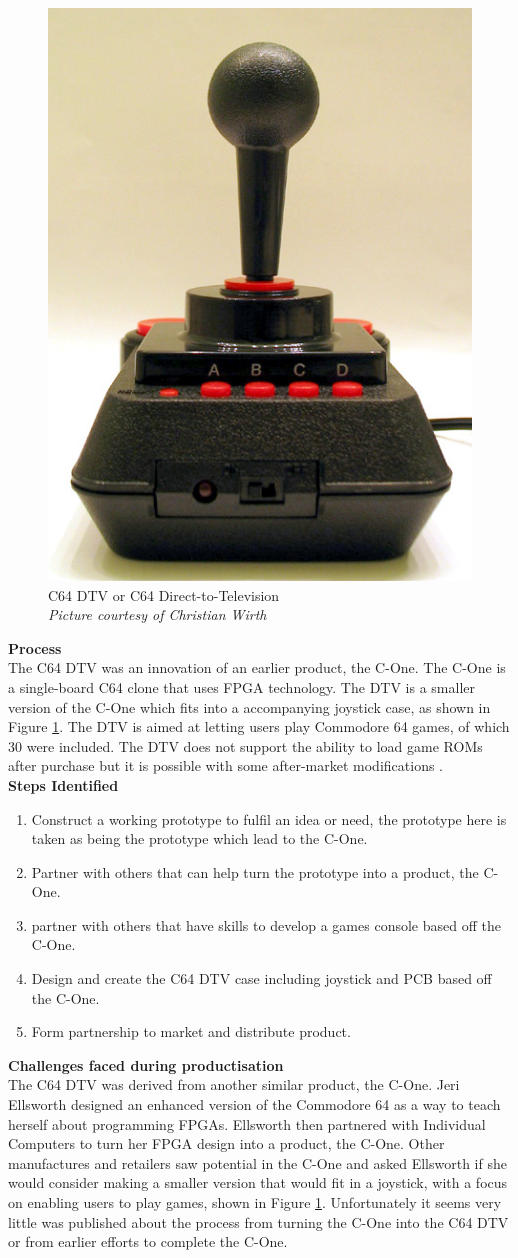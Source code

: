 \begin{figure} \begin{center}
\includegraphics[width=.3\linewidth]{pics/C64_DTV} 
\end{center} 
\caption{C64 DTV or C64 Direct-to-Television \\ \textit{\small{Picture courtesy of Christian Wirth}}}
\label{C64_DTV}
\end{figure}

\textbf{Process}\\
The C64 DTV was an innovation of an earlier product, the C-One. The C-One is a single-board C64 clone that uses FPGA technology. The DTV is a smaller version of the C-One which fits into a accompanying joystick case, as shown in Figure \ref{C64_DTV}. The DTV is aimed at letting users play Commodore 64 games, of which 30 were included. The DTV does not support the ability to load game ROMs after purchase but it is possible with some after-market modifications 
\cite{RN161}.\\

\textbf{Steps Identified}\\
\begin{enumerate}
\item Construct a working prototype to fulfil an idea or need, the prototype here is taken as being the prototype which lead to the C-One. 
\item Partner with others that can help turn the prototype into a product, the C-One.
\item partner with others that have skills to develop a games console based off the C-One.
\item Design and create the C64 DTV case including joystick and PCB based off the C-One.
\item Form partnership to market and distribute product.
\end{enumerate} 

\textbf{Challenges faced during productisation}\\
The C64 DTV was derived from another similar product, the C-One. Jeri Ellsworth designed an enhanced version of the Commodore 64 as a way to teach herself about programming FPGAs. Ellsworth then partnered with Individual Computers to turn her FPGA design into a product, the C-One. Other manufactures and retailers saw potential in the C-One and asked Ellsworth if she would consider making a smaller version that would fit in a joystick, with a focus on enabling users to play games, shown in Figure \ref{C64_DTV}. Unfortunately it seems very little was published about the process from turning the C-One into the C64 DTV or from earlier efforts to complete the C-One.\\

